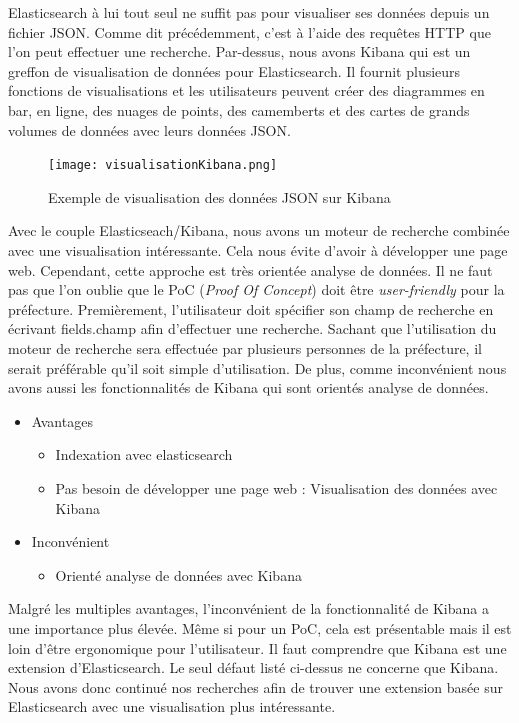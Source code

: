 Elasticsearch à lui tout seul ne suffit pas pour visualiser ses données depuis un fichier JSON. Comme dit précédemment, c’est à l’aide des requêtes HTTP que l’on peut effectuer une recherche. Par-dessus, nous avons Kibana qui est un greffon de visualisation de données pour Elasticsearch. Il fournit plusieurs fonctions de visualisations et les utilisateurs peuvent créer des diagrammes en bar, en ligne, des nuages de points, des camemberts et des cartes de grands volumes de données avec leurs données JSON.

\begin{figure}[h!]
  \centering
  \texttt{[image: visualisationKibana.png]}
	\caption[]{Exemple de visualisation des données JSON sur Kibana}
  \label{}
\end{figure}


Avec le couple Elasticseach/Kibana, nous avons un moteur de recherche combinée avec une visualisation intéressante. Cela nous évite d’avoir à développer une page web. 
Cependant, cette approche est très orientée analyse de données. Il ne faut pas que l’on oublie que le PoC (\textit{Proof Of Concept}) doit être \textit{user-friendly} pour la préfecture. Premièrement, l’utilisateur doit spécifier son champ de recherche en écrivant fields.champ afin d’effectuer une recherche. Sachant que l’utilisation du moteur de recherche sera effectuée par plusieurs personnes de la préfecture, il serait préférable qu’il soit simple d’utilisation. De plus, comme inconvénient nous avons aussi les fonctionnalités de Kibana qui sont orientés analyse de données.

\begin{itemize}
    \item Avantages 
        \begin{itemize}
            \item Indexation avec elasticsearch
            \item Pas besoin de développer une page web : Visualisation des données avec Kibana
        \end{itemize}
    \item Inconvénient 
        \begin{itemize}
        \item Orienté analyse de données avec Kibana
        \end{itemize}
\end{itemize}

Malgré les multiples avantages, l’inconvénient de la fonctionnalité de Kibana a une importance plus élevée. Même si pour un PoC, cela est présentable mais il est loin d’être ergonomique pour l’utilisateur.
Il faut comprendre que Kibana est une extension d’Elasticsearch. Le seul défaut listé ci-dessus ne concerne que Kibana. Nous avons donc continué nos recherches afin de trouver une extension basée sur Elasticsearch avec une visualisation plus intéressante.

